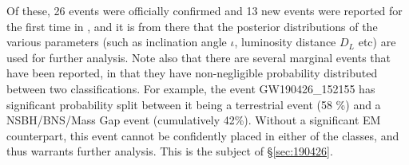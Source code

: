    Of these, 26 events were officially confirmed and 13 new events were reported for
    the first time in \cite{abbott_2020A}, and it is from there that the posterior
    distributions of the various parameters (such as inclination angle $\iota$,
    luminosity distance $D_L$ etc) are used for further analysis.  Note also that there
    are several marginal events that have been reported, in that they have
    non-negligible probability distributed between two classifications. For example, the
    event GW190426\_152155 has significant probability split between it being a
    terrestrial event (58 \%) and a NSBH/BNS/Mass Gap event (cumulatively 42\%). Without
    a significant EM counterpart, this event cannot be confidently placed in either of
    the classes, and thus warrants further analysis. This is the subject of
    \S\ref{sec:190426}.

